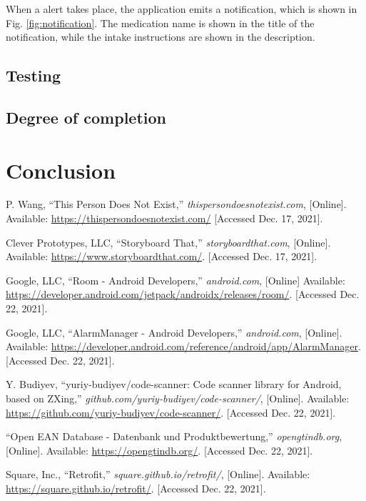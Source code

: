 \documentclass[conference]{IEEEtran}
\begin{document}
When a alert takes place, the application emits a notification, which is shown in Fig. \ref{fig:notification}.
The medication name is shown in the title of the notification, while the intake instructions are shown in the 
description.

\subsection{Testing}

\subsection{Degree of completion}

\section{Conclusion}

\newpage\hfill\newpage %
\begin{thebibliography}{00}	
	 P. Wang, ``This Person Does Not Exist,'' \textit{thispersondoesnotexist.com}, [Online]. Available: \url{https://thispersondoesnotexist.com/} [Accessed Dec. 17, 2021].

	 Clever Prototypes, LLC, ``Storyboard That,'' \textit{storyboardthat.com}, [Online]. Available: \url{https://www.storyboardthat.com/}. [Accessed Dec. 17, 2021].
	
	 Google, LLC, ``Room - Android Developers,'' \textit{android.com}, [Online] Available: \url{https://developer.android.com/jetpack/androidx/releases/room/}. [Accessed Dec. 22, 2021].
		
	 Google, LLC, ``AlarmManager - Android Developers,'' \textit{android.com}, [Online]. Available: \url{https://developer.android.com/reference/android/app/AlarmManager}. [Accessed Dec. 22, 2021].

	 Y. Budiyev, ``yuriy-budiyev/code-scanner: Code scanner library for Android, based on ZXing,'' \textit{github.com/yuriy-budiyev/code-scanner/}, [Online]. Available: \url{https://github.com/yuriy-budiyev/code-scanner/}. [Accessed Dec. 22, 2021].

	 ``Open EAN Database - Datenbank und Produktbewertung,'' \textit{opengtindb.org}, [Online]. Available: \url{https://opengtindb.org/}. [Accessed Dec. 22, 2021].
	
	 Square, Inc., ``Retrofit,'' \textit{square.github.io/retrofit/}, [Online]. Available: \url{https://square.github.io/retrofit/}. [Accessed Dec. 22, 2021].
\end{thebibliography}
\end{document}
